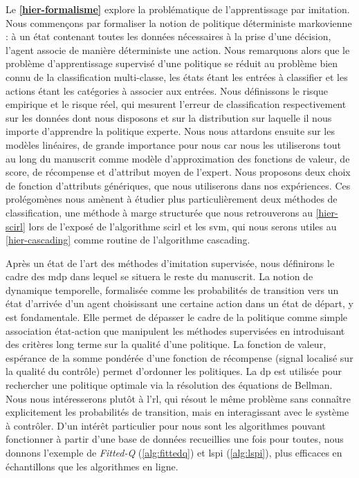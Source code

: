 \documentclass[frenchb,a4paper,justified,notoc]{tufte-book}
\begin{document}
 Le \textbf{\autoref{hier-formalisme}} explore la problématique de l'apprentissage par imitation. Nous commençons par formaliser la notion de politique déterministe markovienne : à un état contenant toutes les données nécessaires à la prise d'une décision, l'agent associe de manière déterministe une action. Nous remarquons alors que le problème d'apprentissage supervisé d'une politique se réduit au problème bien connu de la classification multi-classe, les états étant les entrées à classifier et les actions étant les catégories à associer aux entrées. Nous définissons le risque empirique et le risque réel, qui mesurent l'erreur de classification respectivement sur les données dont nous disposons et sur la distribution sur laquelle il nous importe d'apprendre la politique experte. Nous nous attardons ensuite sur les modèles linéaires, de grande importance pour nous car nous les utiliserons tout au long du manuscrit comme modèle d'approximation des fonctions de valeur, de score, de récompense et d'attribut moyen de l'expert. Nous proposons deux choix de fonction d'attributs génériques, que nous utiliserons dans nos expériences. Ces prolégomènes nous amènent à étudier plus particulièrement deux méthodes de classification, une méthode à marge structurée que nous retrouverons au \autoref{hier-scirl} lors de l'exposé de l'algorithme \gls{scirl} et les \gls{svm}, qui nous serons utiles au \autoref{hier-cascading} comme routine de l'algorithme \gls{cascading}.

Après un état de l'art des méthodes d'imitation supervisée, nous définirons le cadre des \gls{mdp} dans lequel se situera le reste du manuscrit. La notion de dynamique temporelle, formalisée comme les probabilités de transition vers un état d'arrivée d'un agent choisissant une certaine action dans un état de départ, y est fondamentale. Elle permet de dépasser le cadre de la politique comme simple association état-action que manipulent les méthodes supervisées en introduisant des critères long terme sur la qualité d'une politique. La fonction de valeur, espérance de la somme pondérée d'une fonction de récompense (signal localisé sur la qualité du contrôle) permet d'ordonner les politiques. La \gls{dp} est utilisée pour rechercher une politique optimale via la résolution des équations de Bellman. Nous nous intéresserons plutôt à l'\gls{rl}, qui résout le même problème sans connaître explicitement les probabilités de transition, mais en interagissant avec le système à contrôler. D'un intérêt particulier pour nous sont les algorithmes pouvant fonctionner à partir d'une base de données recueillies une fois pour toutes, nous donnons l'exemple de \emph{Fitted-Q} (\autoref{alg:fittedq}) et \gls{lspi} (\autoref{alg:lspi}), plus efficaces en échantillons que les algorithmes en ligne.
\end{document}
